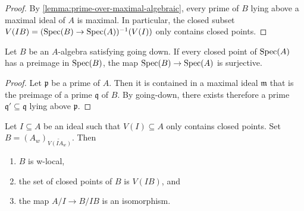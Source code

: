 \begin{proof}
    By \ref{lemma:prime-over-maximal-algebraic}, every prime of $B$ lying above a maximal ideal of $A$
    is maximal. In particular, the closed subset $V(I B) = (\mathrm{Spec}(B) \to \mathrm{Spec}(A))^{-1}(V(I))$ only contains
    closed points.
\end{proof}

\begin{lemma}
    Let $B$ be an $A$-algebra satisfying going down. If every closed point of $\mathrm{Spec}(A)$
    has a preimage in $\mathrm{Spec}(B)$, the map $\mathrm{Spec}(B) \to \mathrm{Spec}(A)$ is surjective.
    \label{lemma:going-down-surjective-of-closed}
\end{lemma}

\begin{proof}
    Let $\mathfrak{p}$ be a prime of $A$. Then it is contained in a maximal ideal $\mathfrak{m}$
    that is the preimage of a prime $\mathfrak{q}$ of $B$. By going-down, there
    exists therefore a prime $\mathfrak{q}' \subseteq \mathfrak{q}$ lying above $\mathfrak{p}$.
\end{proof}

\begin{lemma}
    \label{lemma:closed-closed-points-tilde-w-local}
    Let $I \subseteq A$ be an ideal such that $V(I) \subseteq A$ only contains closed points.
    Set $B = (A_w)_{\widetilde{V(IA_{w})}}$. Then
    \begin{enumerate}
        \item $B$ is w-local,
        \item the set of closed points of $B$ is $V(IB)$, and
        \item the map $A / I \to B / I B$ is an isomorphism.
    \end{enumerate}
\end{lemma}

